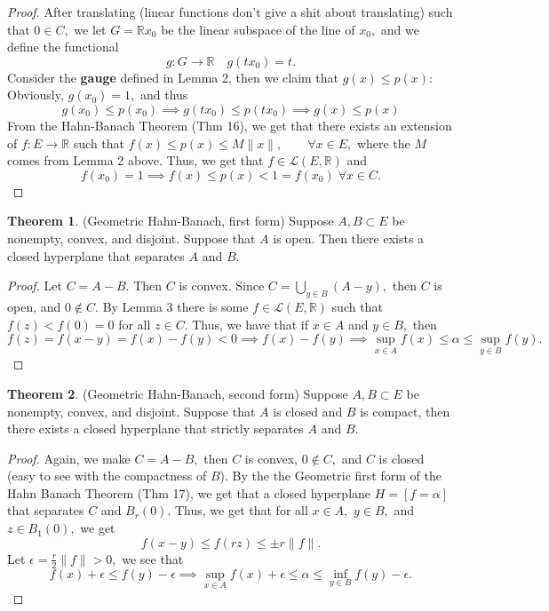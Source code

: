 \documentclass[10pt, oneside]{article}
\newcommand{\bbR}{\mathbb{R}}
\theoremstyle{definition}
\newtheorem{thm}{Theorem}
\begin{document}
\begin{proof}
    After translating (linear functions don't give a shit about translating) such that $0\in C,$ we let $G = \bbR x_0$ be the linear subspace of the line of $x_0,$ and we define the functional
    \[g: G \to \bbR \quad g(t x_0) = t.\] Consider the \textbf{gauge} defined in Lemma 2, then we claim that $g(x) \leq p(x):$ Obviously, $g(x_0) = 1,$ and thus
    \[g(x_0)\leq p(x_0) \implies g(tx_0) \leq p(t x_0) \implies g(x) \leq p(x)\] From the Hahn-Banach Theorem (Thm 16), we get that there exists an extension of $f: E\to \bbR$ such that $f(x)\leq p(x) \leq M\|x\|, \qquad \forall x\in E,$ where the $M$ comes from Lemma 2 above. Thus, we get that $f\in \mathcal{L}(E, \bbR)$ and
    \[f(x_0) = 1 \implies f(x) \leq p(x) < 1 = f(x_0) \; \forall x\in C.\]
\end{proof}

\begin{thm}
    (Geometric Hahn-Banach, first form) Suppose $A, B \subset E$ be nonempty, convex, and disjoint. Suppose that $A$ is open. Then there exists a closed hyperplane that separates $A$ and $B.$ 
\end{thm}
\begin{proof}
    Let $C = A -  B.$ Then $C$ is convex. Since $C = \bigcup_{y\in B}(A - y),$ then $C$ is open, and $0 \notin C.$ By Lemma 3 there is some $f\in \mathcal{L}(E, \bbR)$ such that $f(z) < f(0) = 0$ for all $z\in C.$ Thus, we have that if $x \in A$ and $y \in B,$ then 
    \[f(z) = f(x - y) = f(x) - f(y) < 0 \implies f(x) - f(y) \implies \sup_{x\in A}f(x)\leq \alpha \leq \sup_{y\in B}f(y).\]
\end{proof}



\begin{thm}
    (Geometric Hahn-Banach, second form) Suppose $A, B \subset E$ be nonempty, convex, and disjoint. Suppose that $A$ is closed and $B$ is compact, then there exists a closed hyperplane that strictly separates $A$ and $B.$
\end{thm}
\begin{proof}
    Again, we make $C = A - B,$ then $C$ is convex, $0\notin C,$ and $C$ is closed (easy to see with the compactness of $B$). By the the Geometric first form of the Hahn Banach Theorem (Thm 17), we get that a closed hyperplane $H = [f = \alpha]$ that separates $C$ and $B_r(0).$ Thus, we get that for all $x\in A,$ $y\in B,$ and $z\in B_1(0),$ we get
    \[f(x - y) \leq f(rz) \leq \pm r \|f\|.\] Let $\epsilon = \frac{r}{2}\|f\| >0,$ we see that 
    \[f(x) + \epsilon \leq f(y) - \epsilon  \implies \sup_{x \in A}f(x) + \epsilon \leq \alpha\leq \inf_{y\in B}f(y) - \epsilon.\]
\end{proof}
\end{document}
